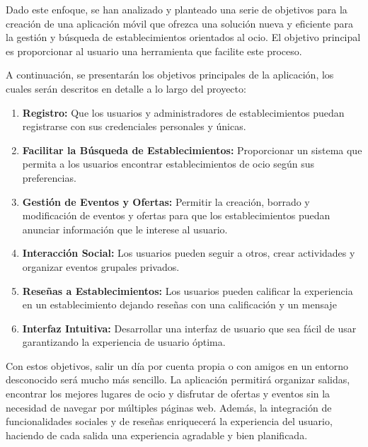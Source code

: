         Dado este enfoque, se han analizado y planteado una serie de objetivos para la creación de una aplicación móvil
        que ofrezca una solución nueva y eficiente para la gestión y búsqueda de establecimientos orientados al ocio. El
        objetivo principal es proporcionar al usuario una herramienta que facilite este proceso.

        A continuación, se presentarán los objetivos principales de la aplicación, los cuales serán descritos en detalle
        a lo largo del proyecto:

        \begin{enumerate}
            \item \textbf{Registro:} Que los usuarios y administradores de establecimientos puedan registrarse con sus
            credenciales personales y únicas.
            \item \textbf{Facilitar la Búsqueda de Establecimientos:} Proporcionar un sistema que permita a los usuarios
            encontrar establecimientos de ocio según sus preferencias.
            \item \textbf{Gestión de Eventos y Ofertas:} Permitir la creación, borrado y modificación de eventos y
            ofertas para que los establecimientos puedan anunciar información que le interese al usuario.
            \item \textbf{Interacción Social:} Los usuarios pueden seguir a otros, crear actividades y organizar eventos
            grupales privados.
            \item \textbf{Reseñas a Establecimientos:} Los usuarios pueden calificar la experiencia en un
            establecimiento dejando reseñas con una calificación y un mensaje
            \item \textbf{Interfaz Intuitiva:} Desarrollar una interfaz de usuario que sea fácil de usar garantizando la
            experiencia de usuario óptima.
        \end{enumerate}

        Con estos objetivos, salir un día por cuenta propia o con amigos en un entorno desconocido será mucho más
        sencillo. La aplicación permitirá organizar salidas, encontrar los mejores lugares de ocio y disfrutar de
        ofertas y eventos sin la necesidad de navegar por múltiples páginas web. Además, la integración de
        funcionalidades sociales y de reseñas enriquecerá la experiencia del usuario, haciendo de cada salida una
        experiencia agradable y bien planificada.

